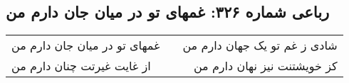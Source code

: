\begin{center}
\section*{رباعی شماره ۳۲۶: غمهای تو در میان جان دارم من}
\label{sec:sh326}
\begin{longtable}{l p{0.5cm} r}
غمهای تو در میان جان دارم من
&&
شادی ز غم تو یک جهان دارم من
\\
از غایت غیرتت چنان دارم من
&&
کز خویشتنت نیز نهان دارم من
\\
\end{longtable}
\end{center}
